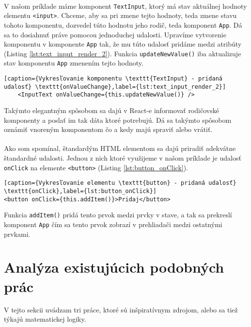 \paragraph{}
V našom príklade máme komponent \texttt{TextInput}, ktorý má stav aktuálnej hodnoty elementu \texttt{<input>}. Chceme, aby sa pri zmene tejto hodnoty, teda zmene stavu tohoto komponentu, dozvedel túto hodnotu jeho rodič, teda komponent \texttt{App}. Dá sa to dosiahnuť práve pomocou jednoduchej udalosti. Upravíme vytvorenie komponentu v komponente \texttt{App} tak, že mu túto udalosť pridáme medzi atribúty (Listing \ref{lst:text_input_render_2}). Funkcia \texttt{updateNewValue()} iba aktualizuje stav komponentu \texttt{App} zmenením tejto hodnoty.
\begin{lstlisting}[caption={Vykresľovanie komponentu \texttt{TextInput} - pridaná udalosť} \texttt{onValueChange},label={lst:text_input_render_2}]
	<InputText onValueChange={this.updateNewValue()} />
\end{lstlisting}
Takýmto elegantným spôsobom sa dajú v React-e informovať rodičovské komponenty a poslať im tak dáta ktoré potrebujú. Dá sa takýmto spôsobom oznámiť vnoreným komponentom čo a kedy majú spraviť alebo vrátiť.
\paragraph{}
Ako som spomínal, štandardým HTML elementom sa dajú priradiť adekvátne štandardné udalosti. Jednou z nich ktoré využijeme v našom príklade je udalosť \texttt{onClick} na elemente \texttt{<button>} (Listing \ref{lst:button_onClick}). 
\begin{lstlisting}[caption={Vykresľovanie elementu \texttt{button} - pridaná udalosť} \texttt{onClick},label={lst:button_onClick}]
<button onClick={this.addItem()}>Pridaj</button>
\end{lstlisting}
Funkcia \texttt{addItem()} pridá tento prvok medzi prvky v stave, a tak sa prekreslí komponent \texttt{App} čím sa tento prvok zobrazí v prehliadači medzi ostatnými prvkami.


\section{Analýza existujúcich podobných prác}
V tejto sekcii uvádzam tri práce, ktoré sú inšpiratívnym zdrojom, alebo sa tiež týkajú matematickej logiky.

